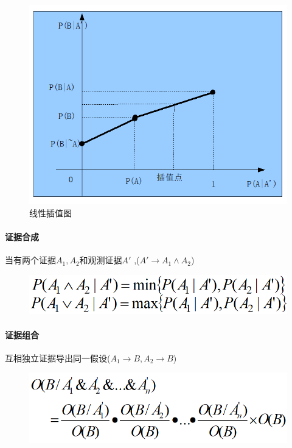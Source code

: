 \documentclass[UTF8,a4paper]{ctexart}
\begin{document}
\begin{figure}[H]
	\centering
	\includegraphics[scale = 0.3]{assets/ArtificialIntelligence/2018-01-09-00-11-35.png}
	\caption{线性插值图}
\end{figure}

\paragraph{证据合成} 当有两个证据$A_1 , A_2$和观测证据$A'$ ,($A' \to A_1 \land A_2$)

\begin{figure}[H]
	\centering
	\includegraphics[scale = 0.3]{assets/ArtificialIntelligence/2018-01-09-00-16-44.png}
\end{figure}


\paragraph{证据组合} 互相独立证据导出同一假设($A_1 \to B , A_2 \to B$)
\begin{figure}[H]
	\centering
	\includegraphics[scale = 0.3]{assets/ArtificialIntelligence/2018-01-09-00-17-49.png}
\end{figure}
\end{document}
